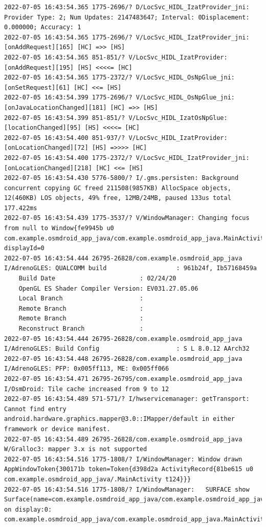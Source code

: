 \documentclass[a4paper,12pt]{book}
\begin{document}
\begin{lstlisting}
2022-07-05 16:43:54.365 1775-2696/? D/LocSvc_HIDL_IzatProvider_jni: Provider Type: 2; Num Updates: 2147483647; Interval: 0Displacement: 0.000000; Accuracy: 1
2022-07-05 16:43:54.365 1775-2696/? V/LocSvc_HIDL_IzatProvider_jni: [onAddRequest][165] [HC] =>> [HS]
2022-07-05 16:43:54.365 851-851/? V/LocSvc_HIDL_IzatProvider: [onAddRequest][195] [HS] <<<<= [HC]
2022-07-05 16:43:54.365 1775-2372/? V/LocSvc_HIDL_OsNpGlue_jni: [onSetRequest][61] [HC] <<= [HS]
2022-07-05 16:43:54.399 1775-2696/? V/LocSvc_HIDL_OsNpGlue_jni: [onJavaLocationChanged][181] [HC] =>> [HS]
2022-07-05 16:43:54.399 851-851/? V/LocSvc_HIDL_IzatOsNpGlue: [locationChanged][95] [HS] <<<<= [HC]
2022-07-05 16:43:54.400 851-937/? V/LocSvc_HIDL_IzatProvider: [onLocationChanged][72] [HS] =>>>> [HC]
2022-07-05 16:43:54.400 1775-2372/? V/LocSvc_HIDL_IzatProvider_jni: [onLocationChanged][218] [HC] <<= [HS]
2022-07-05 16:43:54.430 5776-5800/? I/.gms.persisten: Background concurrent copying GC freed 211508(9857KB) AllocSpace objects, 12(460KB) LOS objects, 49% free, 12MB/24MB, paused 133us total 177.422ms
2022-07-05 16:43:54.439 1775-3537/? V/WindowManager: Changing focus from null to Window{fe9945b u0 com.example.osmdroid_app_java/com.example.osmdroid_app_java.MainActivity} displayId=0
2022-07-05 16:43:54.444 26795-26828/com.example.osmdroid_app_java I/AdrenoGLES: QUALCOMM build                   : 961b24f, Ib57168459a
    Build Date                       : 02/24/20
    OpenGL ES Shader Compiler Version: EV031.27.05.06
    Local Branch                     : 
    Remote Branch                    : 
    Remote Branch                    : 
    Reconstruct Branch               : 
2022-07-05 16:43:54.444 26795-26828/com.example.osmdroid_app_java I/AdrenoGLES: Build Config                     : S L 8.0.12 AArch32
2022-07-05 16:43:54.448 26795-26828/com.example.osmdroid_app_java I/AdrenoGLES: PFP: 0x005ff113, ME: 0x005ff066
2022-07-05 16:43:54.471 26795-26795/com.example.osmdroid_app_java I/OsmDroid: Tile cache increased from 9 to 12
2022-07-05 16:43:54.489 571-571/? I/hwservicemanager: getTransport: Cannot find entry android.hardware.graphics.mapper@3.0::IMapper/default in either framework or device manifest.
2022-07-05 16:43:54.489 26795-26828/com.example.osmdroid_app_java W/Gralloc3: mapper 3.x is not supported
2022-07-05 16:43:54.516 1775-1808/? I/WindowManager: Window drawn AppWindowToken{300171b token=Token{d398d2a ActivityRecord{81be615 u0 com.example.osmdroid_app_java/.MainActivity t124}}}
2022-07-05 16:43:54.516 1775-1808/? I/WindowManager:   SURFACE show Surface(name=com.example.osmdroid_app_java/com.example.osmdroid_app_java.MainActivity)/@0x9a31b37 on display:0: com.example.osmdroid_app_java/com.example.osmdroid_app_java.MainActivity

\end{lstlisting}
\end{document}
